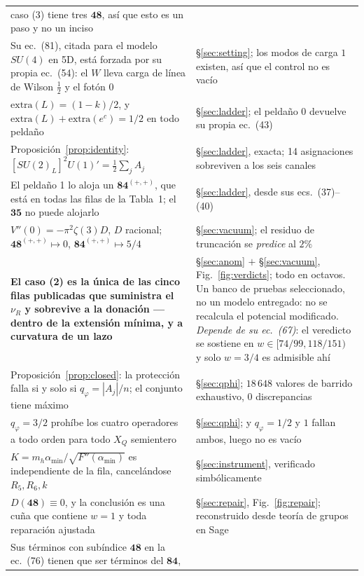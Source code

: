 \documentclass[11pt,a4paper]{article}
\newcommand{\su}[1]{SU(#1)}
\newcommand{\rep}[1]{\mathbf{#1}}
\newcommand{\amin}{\alpha_{\min}}
\begin{document}
\begin{longtable}{p{}p{}}
caso (3) tiene tres $\rep{48}$, así que esto es un paso y no un inciso\\
Su ec.~(81), citada para el modelo $\su4$ en 5D, está forzada por su propia ec.~(54): el $W$ lleva
carga de línea de Wilson $\tfrac12$ y el fotón $0$ & \S\ref{sec:setting}; los modos de carga $1$
existen, así que el control no es vacío\\
$\mathrm{extra}(L)=(1-k)/2$, y $\mathrm{extra}(L)+\mathrm{extra}(e^c)=1/2$ en todo peldaño &
\S\ref{sec:ladder}; el peldaño 0 devuelve su propia ec.~(43)\\
Proposición~\ref{prop:identity}: $[\su2_L]^2U(1)'=\tfrac12\sum_jA_j$ & \S\ref{sec:ladder}, exacta;
14 asignaciones sobreviven a los seis canales\\
El peldaño 1 lo aloja un $\rep{84}^{(+,+)}$, que está en todas las filas de la Tabla~1; el
$\rep{35}$ no puede alojarlo & \S\ref{sec:ladder}, desde sus ecs.~(37)--(40)\\
$V''(0)=-\pi^2\zeta(3)D$, $D$ racional; $\rep{48}^{(+,+)}\mapsto0$, $\rep{84}^{(+,+)}\mapsto5/4$ &
\S\ref{sec:vacuum}; el residuo de truncación se \emph{predice} al $2\%$\\
\rowcolor{amber!12}\textbf{El caso (2) es la única de las cinco filas publicadas que suministra el
$\nu_R$ y sobrevive a la donación --- dentro de la extensión mínima, y a curvatura de un lazo} &
\S\ref{sec:anom} $+$ \S\ref{sec:vacuum}, Fig.~\ref{fig:verdicts}; todo en octavos. Un banco de
pruebas seleccionado, no un modelo entregado: no se recalcula el potencial modificado.
\emph{Depende de su ec.~(67)}: el veredicto se sostiene en $w\in[74/99,118/151)$ y solo $w=3/4$ es
admisible ahí\\
Proposición~\ref{prop:closed}: la protección falla si y solo si $q_\varphi=|A_j|/n$; el conjunto
tiene máximo & \S\ref{sec:qphi}; $18\,648$ valores de barrido exhaustivo, $0$ discrepancias\\
$q_\varphi=3/2$ prohíbe los cuatro operadores a todo orden para todo $X_Q$ semientero &
\S\ref{sec:qphi}; y $q_\varphi=1/2$ y $1$ fallan ambos, luego no es vacío\\
$K=m_h\amin/\sqrt{F''(\amin)}$ es independiente de la fila, cancelándose $R_5,R_6,k$ &
\S\ref{sec:instrument}, verificado simbólicamente\\
$D(\rep{48})\equiv0$, y la conclusión es una cuña que contiene $w=1$ y toda reparación ajustada &
\S\ref{sec:repair}, Fig.~\ref{fig:repair}; reconstruido desde teoría de grupos en Sage\\
Sus términos con subíndice $\rep{48}$ en la ec.~(76) tienen que ser términos del $\rep{84}$,

\end{longtable}
\end{document}

